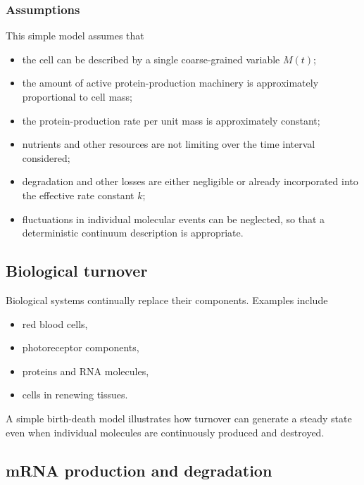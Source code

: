 \subsubsection*{Assumptions}

This simple model assumes that

\begin{itemize}
    \item the cell can be described by a single coarse-grained variable $M(t)$;
    \item the amount of active protein-production machinery is
    approximately proportional to cell mass;
    \item the protein-production rate per unit mass is approximately
    constant;
    \item nutrients and other resources are not limiting over the time interval considered;
    \item degradation and other losses are either negligible or already incorporated into the effective rate constant $k$;
    \item fluctuations in individual molecular events can be neglected, so that a deterministic continuum description is appropriate.
\end{itemize}


\subsection{Biological turnover}

Biological systems continually replace their components. Examples include
\begin{itemize}
    \item red blood cells,
    \item photoreceptor components,
    \item proteins and RNA molecules,
    \item cells in renewing tissues.
\end{itemize}

A simple birth-death model illustrates how turnover can generate a steady state even when individual molecules are continuously produced and destroyed.


\subsection{mRNA production and degradation}

